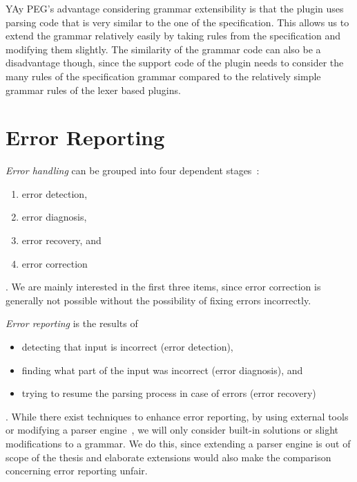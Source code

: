 YAy PEG’s advantage considering grammar extensibility is that the plugin uses parsing code that is very similar to the one of the  specification. This allows us to extend the grammar relatively easily by taking rules from the  specification and modifying them slightly. The similarity of the grammar code can also be a disadvantage though, since the support code of the plugin needs to consider the many rules of the specification grammar compared to the relatively simple grammar rules of the lexer based plugins.

\section{Error Reporting}
\label{sec:error_reporting}

\emph{Error handling} can be grouped into four dependent stages~\cite{ruefenacht2016error, pottier2016reachability}:

\begin{enumerate}
  \item error detection,
  \item error diagnosis,
  \item error recovery, and
  \item error correction
\end{enumerate}

. We are mainly interested in the first three items, since error correction is generally not possible without the possibility of fixing errors incorrectly.

\emph{Error reporting} is the results of

\begin{itemize}
  \item detecting that input is incorrect (error detection),
  \item finding what part of the input was incorrect (error diagnosis), and
  \item trying to resume the parsing process in case of errors (error recovery)
\end{itemize}

. While there exist techniques to enhance error reporting, by using external tools or modifying a parser engine~\cite{jeffery2003generating, cox2010errors}, we will only consider built-in solutions or slight modifications to a grammar. We do this, since extending a parser engine is out of scope of the thesis and elaborate extensions would also make the comparison concerning error reporting unfair.

